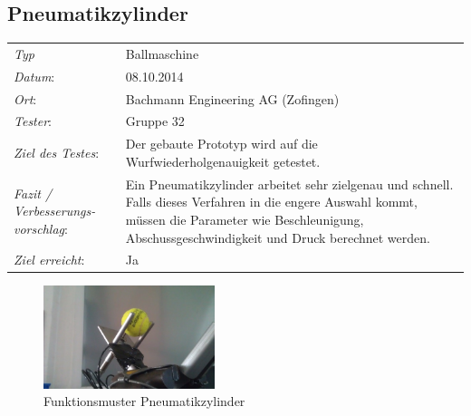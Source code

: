 \subsection{Pneumatikzylinder}

\begin{tabular}{p{3.6cm}p{9.4cm}}
\textit{Typ}              & Ballmaschine \\ 
\textit{Datum}:           & 08.10.2014   \\
\textit{Ort}:             & Bachmann Engineering AG (Zofingen) \\
\textit{Tester}:          & Gruppe 32\\
\textit{Ziel des Testes}: & Der gebaute Prototyp wird auf die Wurfwiederholgenauigkeit getestet. \\
\textit{Fazit / Verbesserungs-\newline vorschlag}: & Ein Pneumatikzylinder arbeitet sehr zielgenau und schnell. Falls dieses Verfahren in die engere Auswahl kommt, müssen die Parameter wie Beschleunigung, Abschussgeschwindigkeit und Druck berechnet werden.\\ 
\textit{Ziel erreicht}:& Ja\\
\end{tabular}

\begin{figure}[h!]
	\includegraphics[width=5cm]{Funktionstests/Bilder/PneumatikzylinderBild.jpg}
	\centering
	\caption{Funktionsmuster Pneumatikzylinder} 
\label{abb:PneumatikzylinderBild}
\end{figure}